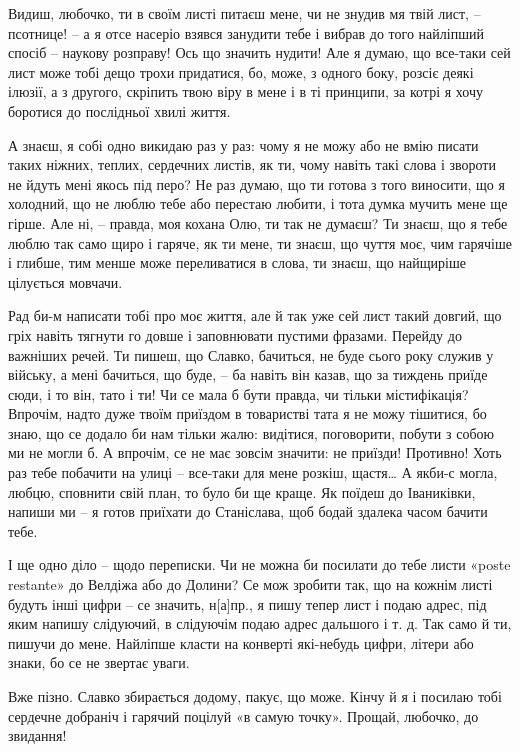 Видиш, любочко, ти в своїм листі питаєш мене, чи не знудив мя твій лист, –
псотнице! – а я отсе насеріо взявся занудити тебе і вибрав до того найліпший
спосіб – наукову розправу! Ось що значить нудити! Але я думаю, що все-таки сей
лист може тобі дещо трохи придатися, бо, може, з одного боку, розсіє деякі
ілюзії, а з другого, скріпить твою віру в мене і в ті принципи, за котрі я хочу
боротися до послідньої хвилі життя.

А знаєш, я собі одно викидаю раз у раз: чому я не можу або не вмію писати таких
ніжних, теплих, сердечних листів, як ти, чому навіть такі слова і звороти не
йдуть мені якось під перо? Не раз думаю, що ти готова з того виносити, що я
холодний, що не люблю тебе або перестаю любити, і тота думка мучить мене ще
гірше. Але ні, – правда, моя кохана Олю, ти так не думаєш? Ти знаєш, що я тебе
люблю так само щиро і гаряче, як ти мене, ти знаєш, що чуття моє, чим гарячіше
і глибше, тим менше може переливатися в слова, ти знаєш, що найщиріше цілується
мовчачи.

Рад би-м написати тобі про моє життя, але й так уже сей лист такий довгий, що
гріх навіть тягнути го довше і заповнювати пустими фразами. Перейду до важніших
речей. Ти пишеш, що Славко, бачиться, не буде сього року служив у війську, а
мені бачиться, що буде, – ба навіть він казав, що за тиждень приїде сюди, і то
він, тато і ти! Чи се мала б бути правда, чи тільки містифікація? Впрочім,
надто дуже твоїм приїздом в товаристві тата я не можу тішитися, бо знаю, що се
додало би нам тільки жалю: видітися, поговорити, побути з собою ми не могли б.
А впрочім, се не має зовсім значити: не приїзди! Противно! Хоть раз тебе
побачити на улиці – все-таки для мене розкіш, щастя… А якби-с могла, любцю,
сповнити свій план, то було би ще краще. Як поїдеш до Іваниківки, напиши ми – я
готов приїхати до Станіслава, щоб бодай здалека часом бачити тебе.

І ще одно діло – щодо переписки. Чи не можна би посилати до тебе листи «poste
restante» до Велдіжа або до Долини? Се мож зробити так, що на кожнім листі
будуть інші цифри – се значить, н[а]пр., я пишу тепер лист і подаю адрес, під
яким напишу слідуючий, в слідуючім подаю адрес дальшого і т. д. Так само й ти,
пишучи до мене. Найліпше класти на конверті які-небудь цифри, літери або знаки,
бо се не звертає уваги.

Вже пізно. Славко збирається додому, пакує, що може. Кінчу й я і посилаю тобі
сердечне добраніч і гарячий поцілуй «в самую точку». Прощай, любочко, до
звидання!

